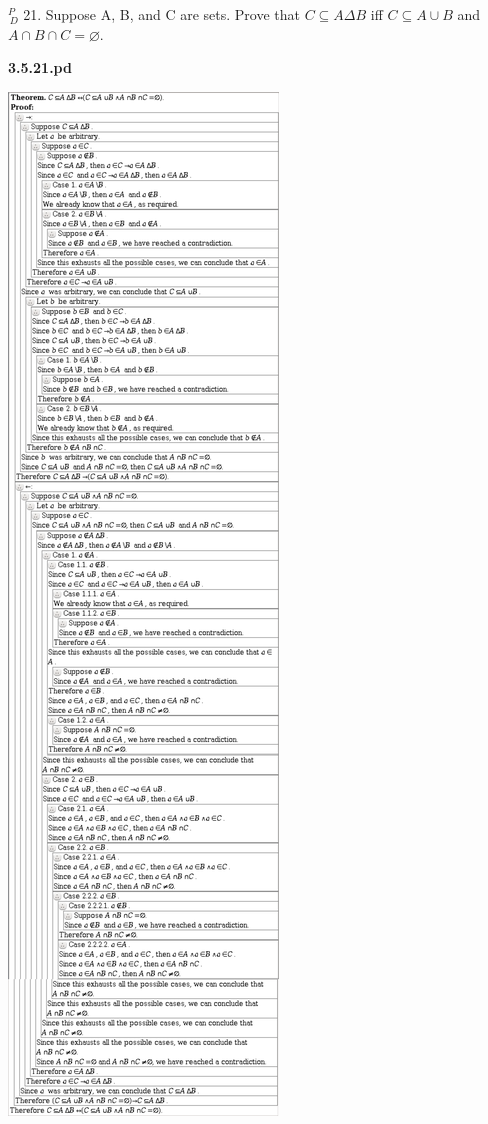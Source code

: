 \documentclass{article}
\begin{document}
\vspace{30pt}

$^{\textit{P}}_{\, \textit{D}}$ 21. Suppose A, B, and C are sets. Prove that $C \subseteq A \Delta B$ iff $C \subseteq A \cup B$ and $A \cap B \cap C = \varnothing$.

\vspace{30pt}

\textbf{3.5.21.pd}
\vspace{10pt}

\includegraphics[scale=0.08]{3_5_21}
\end{document}
